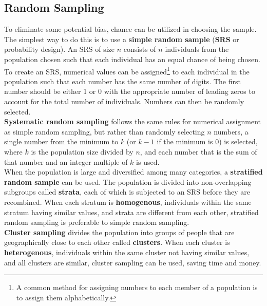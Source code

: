 \documentclass[../AP_Statistics.tex]{subfiles}
\begin{document}
		\subsection*{Random Sampling}
			To eliminate some potential bias, chance can be utilized in choosing the sample. The simplest way to do this is to use a \textbf{simple random sample} (\textbf{SRS} or probability design). An SRS of size $n$ consists of $n$ individuals from the population chosen such that each individual has an equal chance of being chosen. \\
			To create an SRS, numerical values can be assigned\footnote{A common method for assigning numbers to each member of a population is to assign them alphabetically.} to each individual in the population such that each number has the same number of digits. The first number should be either 1 or 0 with the appropriate number of leading zeros to account for the total number of individuals. Numbers can then be randomly selected. \\
			\textbf{Systematic random sampling} follows the same rules for numerical assignment as simple random sampling, but rather than randomly selecting $n$ numbers, a single number from the minimum to $k$ (or $k - 1$ if the minimum is 0) is selected, where $k$ is the population size divided by $n$, and each number that is the sum of that number and an integer multiple of $k$ is used. \\
			When the population is large and diversified among many categories, a \textbf{stratified random sample} can be used. The population is divided into non-overlapping subgroups called \textbf{strata}, each of which is subjected to an SRS before they are recombined. When each stratum is \textbf{homogenous}, individuals within the same stratum having similar values, and strata are different from each other, stratified random sampling is preferable to simple random sampling. \\
			\textbf{Cluster sampling} divides the population into groups of people that are geographically close to each other called \textbf{clusters}. When each cluster is \textbf{heterogenous}, individuals within the same cluster not having similar values, and all clusters are similar, cluster sampling can be used, saving time and money. \\
\end{document}
